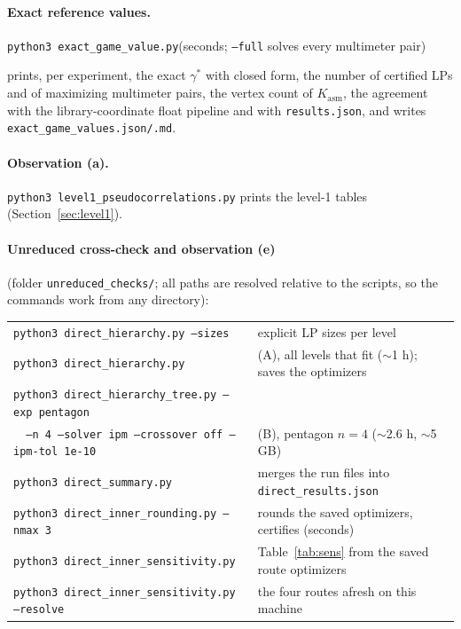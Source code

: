 \documentclass[11pt,a4paper]{article}
\newcommand*{\Kasm}{K_{\mathrm{asm}}}
\newcommand*{\code}[1]{\texttt{#1}}
\theoremstyle{remark}
\begin{document}
\paragraph{Exact reference values.}
\begin{center}
\code{python3 exact\_game\_value.py}\qquad(seconds; \code{--full} solves every multimeter pair)
\end{center}
prints, per experiment, the exact $\gamma^*$ with closed form, the number
of certified LPs and of maximizing multimeter pairs, the vertex count of
$\Kasm$, the agreement with the library-coordinate float pipeline and with
\code{results.json}, and writes \code{exact\_game\_values.json/.md}.

\paragraph{Observation (a).}
\code{python3 level1\_pseudocorrelations.py} prints the level-1 tables
(Section~\ref{sec:level1}).

\paragraph{Unreduced cross-check and observation (e)} (folder
\code{unreduced\_checks/}; all paths are resolved relative to the scripts,
so the commands work from any directory):
\begin{center}\small
\begin{tabular}{@{}l@{\quad}>{\raggedright\arraybackslash}p{58mm}@{}}
\code{python3 direct\_hierarchy.py --sizes} & explicit LP sizes per level\\
\code{python3 direct\_hierarchy.py} & (A), all levels that fit ($\sim$1 h); saves the optimizers\\
\code{python3 direct\_hierarchy\_tree.py --exp pentagon} & \\
\code{\ \ --n 4 --solver ipm --crossover off --ipm-tol 1e-10} & (B), pentagon $n=4$ ($\sim$2.6 h, $\sim$5 GB)\\
\code{python3 direct\_summary.py} & merges the run files into \code{direct\_results.json}\\
\code{python3 direct\_inner\_rounding.py --nmax 3} & rounds the saved optimizers, certifies (seconds)\\
\code{python3 direct\_inner\_sensitivity.py} & Table~\ref{tab:sens} from the saved route optimizers\\
\code{python3 direct\_inner\_sensitivity.py --resolve} & the four routes afresh on this machine\\
\end{tabular}
\end{center}
\end{document}
